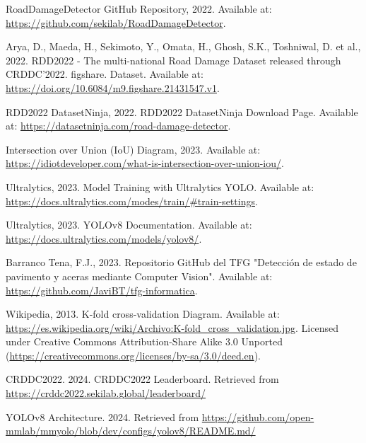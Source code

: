 \begin{thebibliography}{99}
        RoadDamageDetector GitHub Repository, 2022. Available at: \url{https://github.com/sekilab/RoadDamageDetector}.

        Arya, D., Maeda, H., Sekimoto, Y., Omata, H., Ghosh, S.K., Toshniwal, D. et al., 2022. RDD2022 - The multi-national Road Damage Dataset released through CRDDC'2022. figshare. Dataset. Available at: \url{https://doi.org/10.6084/m9.figshare.21431547.v1}.

        RDD2022 DatasetNinja, 2022. RDD2022 DatasetNinja Download Page. Available at: \url{https://datasetninja.com/road-damage-detector}.

        Intersection over Union (IoU) Diagram, 2023. Available at: \url{https://idiotdeveloper.com/what-is-intersection-over-union-iou/}.

        Ultralytics, 2023. Model Training with Ultralytics YOLO. Available at: \url{https://docs.ultralytics.com/modes/train/#train-settings}.

        Ultralytics, 2023. YOLOv8 Documentation. Available at: \url{https://docs.ultralytics.com/models/yolov8/}.

        Barranco Tena, F.J., 2023. Repositorio GitHub del TFG "Detección de estado de pavimento y aceras mediante Computer Vision". Available at: \url{https://github.com/JaviBT/tfg-informatica}.

        Wikipedia, 2013. K-fold cross-validation Diagram. Available at: \url{https://es.wikipedia.org/wiki/Archivo:K-fold_cross_validation.jpg}. Licensed under Creative Commons Attribution-Share Alike 3.0 Unported (\url{https://creativecommons.org/licenses/by-sa/3.0/deed.en}).

        CRDDC2022. 2024. CRDDC2022 Leaderboard. Retrieved from \url{https://crddc2022.sekilab.global/leaderboard/}
    
        YOLOv8 Architecture. 2024. Retrieved from \url{https://github.com/open-mmlab/mmyolo/blob/dev/configs/yolov8/README.md/}

\end{thebibliography}  